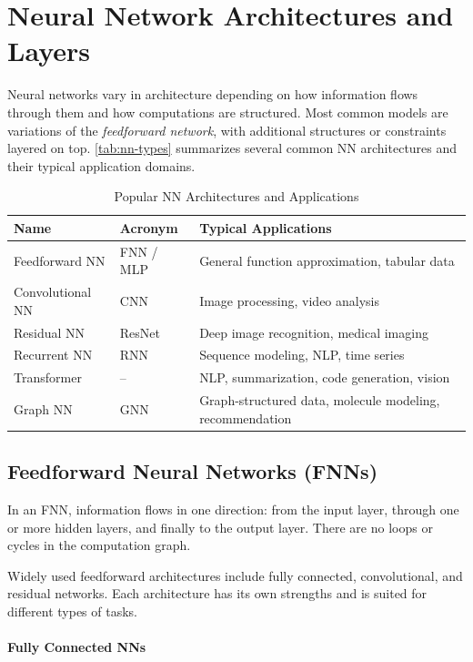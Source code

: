 \documentclass[oneside,11pt,dvipsnames]{book}
\numberwithin{equation}{section}
\theoremstyle{definition}
\theoremstyle{remark}
\begin{document}
\section{Neural Network Architectures and Layers}

Neural networks vary in architecture depending on how information flows through them and how computations are structured. Most common models are variations of the \emph{feedforward network}, with additional structures or constraints layered on top.  \autoref{tab:nn-types} summarizes several common NN architectures and their typical application domains.

\begin{table}[ht]
\caption{Popular NN Architectures and Applications}\label{tab:nn-types}
\centering
\small
\begin{tabular}{llp{8cm}@{}}
\toprule
\textbf{Name} & \textbf{Acronym} & \textbf{Typical Applications} \\
\midrule
Feedforward NN & FNN / MLP & General function approximation, tabular data \\
Convolutional NN & CNN & Image processing, video analysis \\
Residual NN & ResNet & Deep image recognition, medical imaging \\
Recurrent NN & RNN & Sequence modeling, NLP, time series \\
Transformer & -- & NLP, summarization, code generation, vision \\
Graph NN & GNN & Graph-structured data, molecule modeling, recommendation \\
\bottomrule
\end{tabular}
\end{table}




\subsection{Feedforward Neural Networks (FNNs)}\label{sec:ffn}

In an FNN, information flows in one direction: from the input layer, through one or more hidden layers, and finally to the output layer. There are no loops or cycles in the computation graph. 

Widely used feedforward architectures include fully connected, convolutional, and residual networks. Each architecture has its own strengths and is suited for different types of tasks.

\paragraph{Fully Connected NNs}
\end{document}
